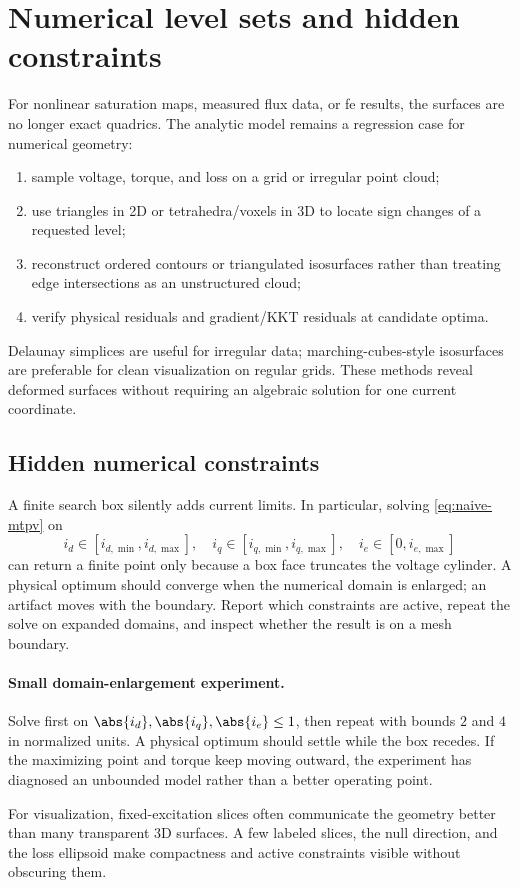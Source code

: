 \section{Numerical level sets and hidden constraints}

For nonlinear saturation maps, measured flux data, or \gls{fe} results, the
surfaces are no longer exact quadrics.  The analytic model remains a regression
case for numerical geometry:
\begin{enumerate}
 \item sample voltage, torque, and loss on a grid or irregular point cloud;
 \item use triangles in 2D or tetrahedra/voxels in 3D to locate sign changes of
       a requested level;
 \item reconstruct ordered contours or triangulated isosurfaces rather than
       treating edge intersections as an unstructured cloud;
 \item verify physical residuals and gradient/KKT residuals at candidate
       optima.
\end{enumerate}
Delaunay simplices are useful for irregular data; marching-cubes-style
isosurfaces are preferable for clean visualization on regular grids.  These
methods reveal deformed surfaces without requiring an algebraic solution for
one current coordinate.

\subsection{Hidden numerical constraints}

A finite search box silently adds current limits.  In particular, solving
\cref{eq:naive-mtpv} on
\begin{equation}
 i_d\in[i_{d,\min},i_{d,\max}],\quad
 i_q\in[i_{q,\min},i_{q,\max}],\quad
 i_e\in[0,i_{e,\max}]
\end{equation}
can return a finite point only because a box face truncates the voltage
cylinder.  A physical optimum should converge when the numerical domain is
enlarged; an artifact moves with the boundary.  Report which constraints are
active, repeat the solve on expanded domains, and inspect whether the result is
on a mesh boundary.

\paragraph{Small domain-enlargement experiment.}
Solve first on $\abs{i_d},\abs{i_q},\abs{i_e}\leq1$, then repeat with bounds
$2$ and $4$ in normalized units.  A physical optimum should settle while the
box recedes.  If the maximizing point and torque keep moving outward, the
experiment has diagnosed an unbounded model rather than a better operating
point.

For visualization, fixed-excitation slices often communicate the geometry
better than many transparent 3D surfaces.  A few labeled slices, the null
direction, and the loss ellipsoid make compactness and active constraints
visible without obscuring them.
